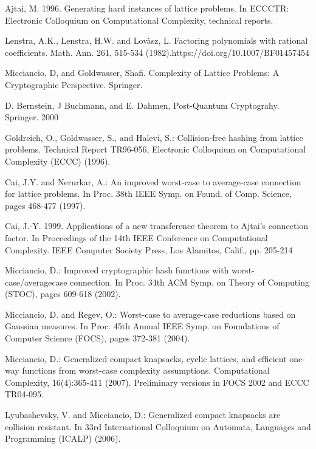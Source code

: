 \documentclass[10pt]{elsarticle}
\begin{document}
%
% 
% 
\begin{thebibliography}{9}

 Ajtai, M. 1996. Generating hard instances of lattice problems. In ECCCTR: Electronic Colloquium on Computational Complexity, technical reports.

Lenstra, A.K., Lenstra, H.W. and Lov{\` a}sz, L. Factoring polynomials with rational coefficients. Math. Ann. 261, 515-534 (1982).https://doi.org/10.1007/BF01457454

 Micciancio, D, and Goldwasser, Shafi. Complexity of Lattice Problems: A Cryptographic Perspective. Springer.

D. Bernstein, J Buchmann, and E. Dahmen, Post-Quantum Cryptograhy. Springer. 2000

Goldreich, O., Goldwasser, S., and Halevi, S.: Collision-free hashing from lattice problems. Technical Report TR96-056, Electronic Colloquium on Computational
Complexity (ECCC) (1996).

 Cai, J.Y. and Nerurkar, A.: An improved worst-case to average-case connection for lattice problems. In Proc. 38th IEEE Symp. on Found. of Comp. Science, pages 468-477 (1997).

 Cai, J.-Y. 1999. Applications of a new transference theorem to Ajtai’s connection factor. In Proceedings of the 14th IEEE Conference on Computational Complexity. IEEE Computer Society Press, Los Alamitos, Calif., pp. 205-214

Micciancio, D.: Improved cryptographic hash functions with worst-case/averagecase connection. In Proc. 34th ACM Symp. on Theory of Computing (STOC), pages 609-618 (2002).

Micciancio, D. and Regev, O.: Worst-case to average-case reductions based on Gaussian measures. In Proc. 45th Annual IEEE Symp. on Foundations of Computer Science (FOCS), pages 372-381 (2004).

Micciancio, D.: Generalized compact knapsacks, cyclic lattices, and efficient one- way functions from worst-case complexity assumptions. Computational Complexity, 16(4):365-411 (2007). Preliminary versions in FOCS 2002 and ECCC TR04-095.

Lyubashevsky, V. and Micciancio, D.: Generalized compact knapsacks are collision resistant. In 33rd International Colloquium on Automata, Languages and Programming (ICALP) (2006).


\end{thebibliography}
\end{document}
